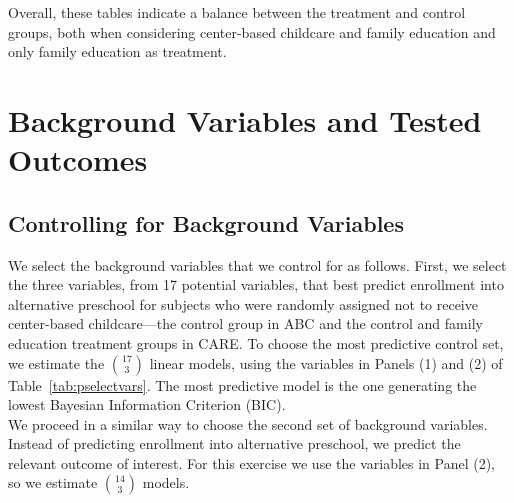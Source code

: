 \begin{appendices}
















\noindent Overall, these tables indicate a balance between the treatment and control groups, both when considering center-based childcare and family education and only family education as treatment.

\setcounter{figure}{0}  \renewcommand{\thefigure}{B.\arabic{figure}}
\setcounter{table}{0}   \renewcommand{\thetable}{B.\arabic{table}}
\section{Background Variables and Tested Outcomes} \label{appendix:controls}

\subsection{Controlling for Background Variables}

\noindent We select the background variables that we control for as follows. First, we select the three variables, from 17 potential variables, that best predict enrollment into alternative preschool for subjects who were randomly assigned not to receive center-based childcare---the control group in ABC and the control and family education treatment groups in CARE. To choose the most predictive control set, we estimate the $17 \choose 3$ linear models, using the variables in Panels (1) and (2) of Table~\ref{tab:pselectvars}. The most predictive model is the one generating the lowest Bayesian Information Criterion (BIC).\\

\noindent We proceed in a similar way to choose the second set of background variables. Instead of predicting enrollment into alternative preschool, we predict the relevant outcome of interest. For this exercise we use the variables in Panel (2), so we estimate $14 \choose 3$ models.\\


\end{appendices}
